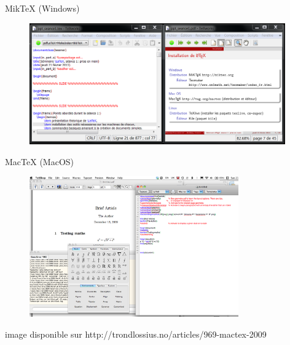 \documentclass{beamer}
\begin{document}

\begin{frame}{MikTeX (Windows)}

\begin{figure} %
\centering %
\includegraphics[width=11cm]{img/miktex_1} %
\end{figure} %

\end{frame}


\begin{frame}{MacTeX (MacOS)}

\begin{figure} %
\centering %
\includegraphics[width=9cm]{img/mactex_1} %
\end{figure} %

{\footnotesize image disponible sur http://trondlossius.no/articles/969-mactex-2009}

\end{frame}
\end{document}
